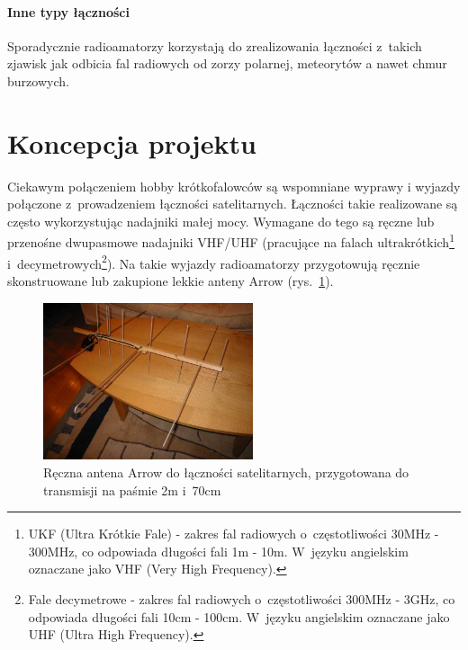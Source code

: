 \documentclass[eng,oneside]{mgr}
\begin{document}
					\paragraph{Inne typy łączności}
					Sporadycznie radioamatorzy korzystają do zrealizowania łączności z~takich zjawisk jak odbicia fal radiowych od zorzy polarnej, meteorytów a nawet chmur burzowych.

		\section{Koncepcja projektu}
		\label{sec:problem_description}
		Ciekawym połączeniem hobby krótkofalowców są wspomniane wyprawy i wyjazdy połączone z~prowadzeniem łączności satelitarnych. Łączności takie realizowane są często wykorzystując nadajniki małej mocy. Wymagane do tego są ręczne lub przenośne dwupasmowe nadajniki VHF/UHF (pracujące na falach ultrakrótkich\footnote{UKF (Ultra Krótkie Fale) - zakres fal radiowych o~częstotliwości 30MHz - 300MHz, co odpowiada długości fali 1m - 10m. W~języku angielskim oznaczane jako VHF (Very High Frequency).} i~decymetrowych\footnote{Fale decymetrowe - zakres fal radiowych o~częstotliwości 300MHz - 3GHz, co odpowiada długości fali 10cm - 100cm. W~języku angielskim oznaczane jako UHF (Ultra High Frequency).}). Na takie wyjazdy radioamatorzy przygotowują ręcznie skonstruowane lub zakupione lekkie anteny Arrow (rys.~\ref{fig:example_handheld_arrow_antenna}). 

		\begin{figure}
			\vspace{-20pt}
			\begin{center}
				\includegraphics[width=0.55\textwidth]{arrow1}
			\end{center}
			\vspace{-20pt}
			\caption{Ręczna antena Arrow do łączności satelitarnych, przygotowana do transmisji na paśmie 2m i~70cm}
			\vspace{-20pt}
			\label{fig:example_handheld_arrow_antenna}
		\end{figure}
\end{document}
